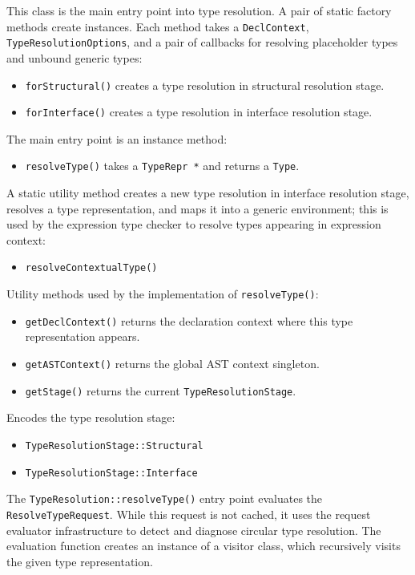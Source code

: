 \documentclass[../generics]{subfiles}
\begin{document}
This class is the main entry point into type resolution. A pair of static factory methods create instances. Each method takes a \texttt{DeclContext}, \texttt{TypeResolutionOptions}, and a pair of callbacks for resolving placeholder types and unbound generic types:
\begin{itemize}
\item \texttt{forStructural()} creates a type resolution in structural resolution stage.
\item \texttt{forInterface()} creates a type resolution in interface resolution stage.
\end{itemize}
The main entry point is an instance method:
\begin{itemize}
\item \texttt{resolveType()} takes a \texttt{TypeRepr *} and returns a \texttt{Type}.
\end{itemize}
A static utility method creates a new type resolution in interface resolution stage, resolves a type representation, and maps it into a generic environment; this is used by the expression type checker to resolve types appearing in expression context:
\begin{itemize}
\item \texttt{resolveContextualType()}
\end{itemize}
Utility methods used by the implementation of \texttt{resolveType()}:
\begin{itemize}
\item \texttt{getDeclContext()} returns the declaration context where this type representation appears.
\item \texttt{getASTContext()} returns the global AST context singleton.
\item \texttt{getStage()} returns the current \texttt{TypeResolutionStage}.
\end{itemize}

Encodes the type resolution stage:
\begin{itemize}
\item \texttt{TypeResolutionStage::Structural}
\item \texttt{TypeResolutionStage::Interface}
\end{itemize}

The \texttt{TypeResolution::resolveType()} entry point evaluates the \texttt{ResolveTypeRequest}. While this request is not cached, it uses the request evaluator infrastructure to detect and diagnose circular type resolution. The evaluation function creates an instance of a visitor class, which recursively visits the given type representation.
\end{document}
